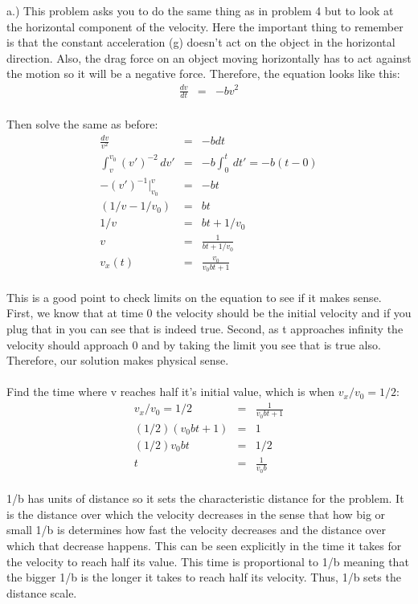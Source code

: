\documentclass[11pt]{amsart}
\begin{document}
a.) This problem asks you to do the same thing as in problem 4 but to look at the horizontal component of the velocity. Here the important thing to remember is that the constant acceleration (g) doesn't act on the object in the horizontal direction. Also, the drag force on an object moving horizontally has to act against the motion so it will be a negative force. Therefore, the equation looks like this: \\
\begin{eqnarray*}
\frac{dv}{dt} &=& -bv^{2}  
\end{eqnarray*} \\
Then solve the same as before: \\
\begin{eqnarray*}
\frac{dv}{v^{2}} &=& -bdt \\
\int^{v_{0}}_{v}(v')^{-2}\,dv' &=& -b\int^{t}_{0}\,dt' =-b(t-0) \\
-(v')^{-1}|^{v}_{v_{0}} &=& -bt \\
(1/v - 1/v_{0}) &=& bt \\
1/v &=& bt +1/v_{0} \\
v &=& \frac{1}{bt + 1/v_{0}} \\ 
v_{x}(t) &=& \frac{v_{0}}{v_{0}bt + 1} 
\end{eqnarray*}  \\
This is a good point to check limits on the equation to see if it makes sense. First, we know that at time 0 the velocity should be the initial velocity and if you plug that in you can see that is indeed true. Second, as t approaches infinity the velocity should approach 0 and by taking the limit you see that is true also. Therefore, our solution makes physical sense. \\ \\
Find the time where v reaches half it's initial value, which is when $v_{x}/v_{0}=1/2$: \\ 
\begin{eqnarray*} 
v_{x}/v_{0} = 1/2 &=& \frac{1}{v_{0}bt+1} \\
(1/2)(v_{0}bt+1) &=& 1 \\
(1/2)v_{0}bt &=& 1/2 \\
t &=& \frac{1}{v_{0}b} 
\end{eqnarray*} \\
1/b has units of distance so it sets the characteristic distance for the problem. It is the distance over which the velocity decreases in the sense that how big or small 1/b is determines how fast the velocity decreases and the distance over which that decrease happens. This can be seen explicitly in the time it takes for the velocity to reach half its value. This time is proportional to 1/b meaning that the bigger 1/b is the longer it takes to reach half its velocity. Thus, 1/b sets the distance scale. \\ \\
\end{document}
